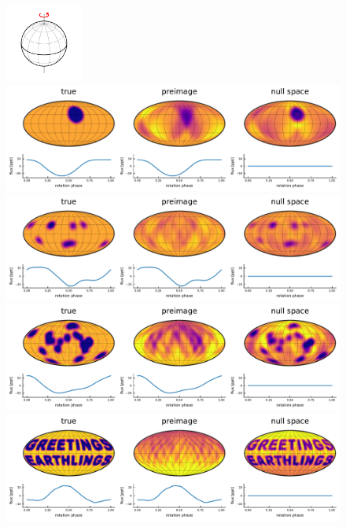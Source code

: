 \documentclass[modern]{aastex62}
\begin{document}
\begin{figure}[p!]
    \begin{centering}
        \vspace{-4em}
        \includegraphics[width=1in]{figures/wireframe_60.pdf}
        \\[0.5em]
        \includegraphics[width=\linewidth]{figures/nullspace_preimage_60a.pdf}
        \\[1em]
        \includegraphics[width=\linewidth]{figures/nullspace_preimage_60b.pdf}
        \\[1em]
        \includegraphics[width=\linewidth]{figures/nullspace_preimage_60c.pdf}
        \\[1em]
        \includegraphics[width=\linewidth]{figures/nullspace_preimage_60d.pdf}

\end{centering}
\end{figure}
\end{document}
